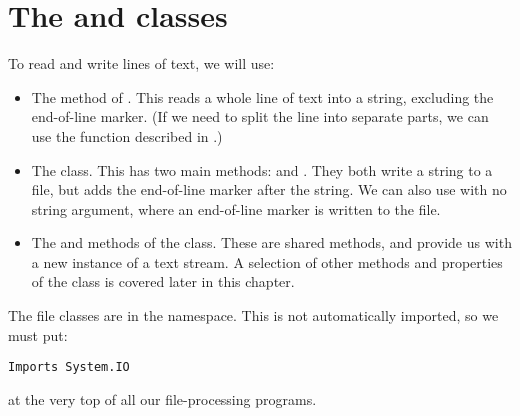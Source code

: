	\section{The  and  classes}
		To read and write lines of text, we will use:
		\begin{itemize}
			\item The  method of . This reads a whole line of text into a string, excluding the end-of-line marker. (If we need to split the line into separate parts, we can use the  function described in .)
			\item The  class. This has two main methods:  and . They both write a string to a file, but  adds the end-of-line marker after the string. We can also use  with no string argument, where an end-of-line marker is written to the file.
			\item The  and  methods of the  class. These are shared methods, and provide us with a new instance of a text stream. A selection of other methods and properties of the  class is covered later in this chapter.
		 \end{itemize}
		 The file classes are in the  namespace. This is not automatically imported, so we must put:
		\begin{lstlisting}
Imports System.IO
		\end{lstlisting}
		at the very top of all our file-processing programs.


